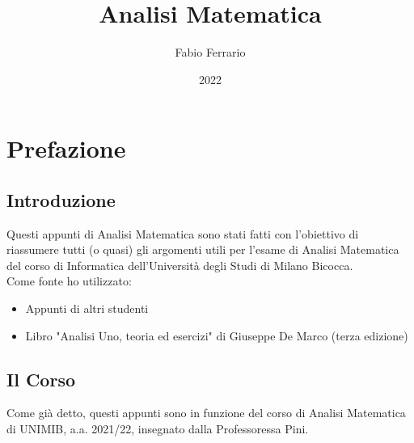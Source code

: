 \documentclass[12pt, a4paper, openany]{book}
\begin{document}


\title{Analisi Matematica}
\author{Fabio Ferrario}
\date{2022}
\maketitle

\tableofcontents

\chapter*{Prefazione}
\section{Introduzione}
Questi appunti di Analisi Matematica sono stati fatti con l'obiettivo di riassumere tutti (o quasi) gli argomenti utili per l'esame di Analisi Matematica del corso di Informatica dell'Università degli Studi di Milano Bicocca.
\\Come fonte ho utilizzato:
\begin{itemize}
    \item Appunti di altri studenti
    \item Libro "Analisi Uno, teoria ed esercizi" di Giuseppe De Marco (terza edizione) 
\end{itemize}
\section*{Il Corso}
Come già detto, questi appunti sono in funzione del corso di Analisi Matematica di UNIMIB, a.a. 2021/22, insegnato dalla Professoressa Pini.
\end{document}
